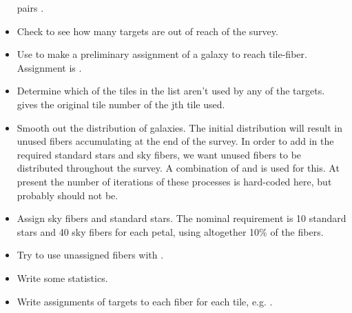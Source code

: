 \documentclass[12pt]{article}
\begin{document}
\begin{itemize}
pairs .
\item Check to see how many targets are out of reach of the survey.
\item Use  to make a preliminary assignment of a galaxy to reach tile-fiber.  Assignment is .
\item Determine which of the tiles in the list aren't used by any of the targets.  gives the original tile number of the jth tile used.
\item Smooth out the distribution of galaxies.  The initial distribution will result in unused fibers accumulating at the end of the survey.  In order to add in the required standard stars and sky fibers, we want unused fibers to be distributed throughout the survey.  A combination of  and  is used for this.  At present the number of iterations of these processes is hard-coded here, but probably should not be.
\item Assign sky fibers and standard stars. The nominal requirement is 10 standard stars and 40 sky fibers for each petal, using altogether 10\% of the fibers.
\item Try to use unassigned fibers with .
\item Write some statistics.
\item Write assignments of targets to each fiber for each tile, e.g. .
\end{itemize}
\end{document}
